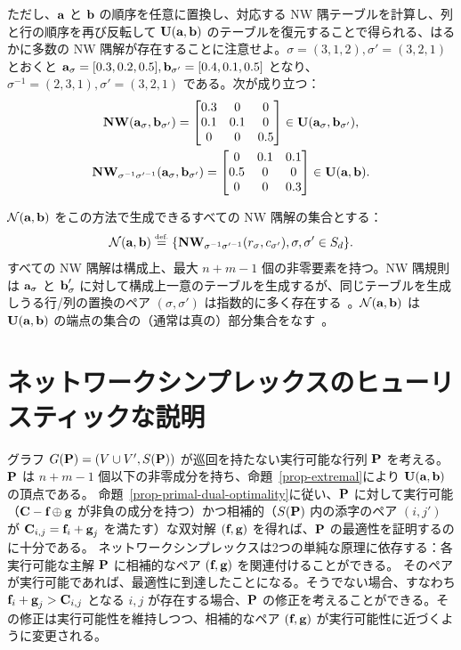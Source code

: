 ただし、$\a$ と $\b$ の順序を任意に置換し、対応する NW 隅テーブルを計算し、列と行の順序を再び反転して $\CouplingsD(\a,\b)$ のテーブルを復元することで得られる、はるかに多数の NW 隅解が存在することに注意せよ。$\sigma=(3,1,2),\sigma'=(3,2,1)$ とおくと $\a_\sigma=[0.3,0.2,0.5], \b_{\sigma'}=[0.4,0.1,0.5]$ となり、$\sigma^{-1}=(2,3,1),\sigma'=(3,2,1)$ である。次が成り立つ：
\begin{gather*}
\NW(\a_\sigma,\b_{\sigma'}) = \begin{bmatrix} 0.3 & 0 & 0 \\ 0.1 & 0.1 & 0 \\ 0& 0 & 0.5\end{bmatrix} \in \CouplingsD(\a_\sigma,\b_{\sigma'}),\\
\NW_{\sigma^{-1}\sigma'^{-1}}(\a_\sigma,\b_{\sigma'})= \begin{bmatrix} 0 & 0.1 & 0.1 \\ 0.5 & 0 & 0 \\ 0& 0 & 0.3\end{bmatrix}\in \CouplingsD(\a,\b).
\end{gather*}

$\mathcal{N}(\a,\b)$ をこの方法で生成できるすべての NW 隅解の集合とする：
$$\mathcal{N}(\a,\b)\eqdef\{ \NW_{\sigma^{-1}\sigma'^{-1}}(r_\sigma,c_{\sigma'}), \sigma,\sigma'\in S_d\}.$$
すべての NW 隅解は構成上、最大 $n+m-1$ 個の非零要素を持つ。NW 隅規則は $\a_\sigma$ と $\b_\sigma'$ に対して構成上一意のテーブルを生成するが、同じテーブルを生成しうる行/列の置換のペア $(\sigma,\sigma')$ は指数的に多く存在する~\citep[p. 2]{stougie2002polynomial}。$\mathcal{N}(\a,\b)$ は $\CouplingsD(\a,\b)$ の端点の集合の（通常は真の）部分集合をなす~\citep[Cor. 8.1.4]{brualdi2006combinatorial}。



\section{ネットワークシンプレックスのヒューリスティックな説明}\label{s-networksimplex}

グラフ $G(\P)=(V\cup V',S(\P))$ が巡回を持たない実行可能な行列 $\P$ を考える。$\P$ は $n+m-1$ 個以下の非零成分を持ち、命題~\ref{prop-extremal}により $\CouplingsD(\a,\b)$ の頂点である。
命題~\ref{prop-primal-dual-optimality}に従い、$\P$ に対して実行可能（\ie $\C-\fD\oplus\gD$ が非負の成分を持つ）かつ相補的（$S(\P)$ 内の添字のペア $(i,j')$ が $\C_{i,j}=\fD_i+\gD_j$ を満たす）な双対解 $(\fD,\gD)$ を得れば、$\P$ の最適性を証明するのに十分である。
ネットワークシンプレックスは2つの単純な原理に依存する：各実行可能な主解 $\P$ に相補的なペア $(\fD,\gD)$ を関連付けることができる。
そのペアが実行可能であれば、最適性に到達したことになる。そうでない場合、すなわち $\fD_i+\gD_j> \C_{i,j}$ となる $i,j$ が存在する場合、$\P$ の修正を考えることができる。その修正は実行可能性を維持しつつ、相補的なペア $(\fD,\gD)$ が実行可能性に近づくように変更される。

